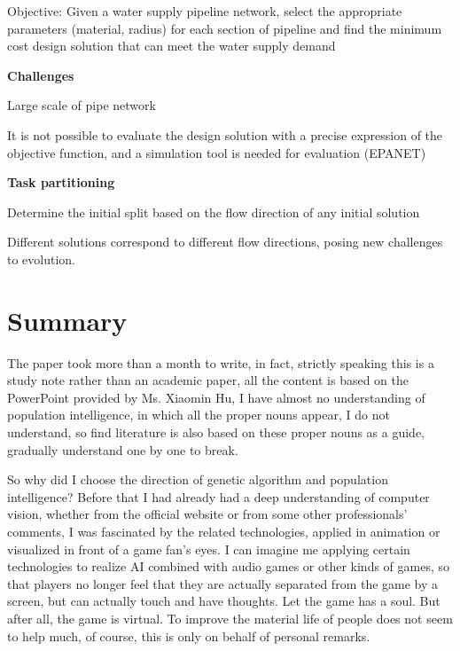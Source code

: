 \documentclass[twocolumn]{article}
\begin{document}
Objective: Given a water supply pipeline network, select the appropriate
parameters (material, radius) for each section of pipeline and find the
minimum cost design solution that can meet the water supply demand

\textbf{Challenges}

Large scale of pipe network

It is not possible to evaluate the design solution with a precise
expression of the objective function, and a simulation tool is needed
for evaluation (EPANET)

\textbf{Task partitioning}

Determine the initial split based on the flow direction of any initial
solution

Different solutions correspond to different flow directions, posing new
challenges to evolution.

\section{Summary}

The paper took more than a month to write, in fact, strictly speaking
this is a study note rather than an academic paper, all the content is
based on the PowerPoint provided by Ms. Xiaomin Hu, I have almost no
understanding of population intelligence, in which all the proper nouns
appear, I do not understand, so find literature is also based on these
proper nouns as a guide, gradually understand one by one to break.

So why did I choose the direction of genetic algorithm and population
intelligence? Before that I had already had a deep understanding of
computer vision, whether from the official website or from some other
professionals' comments, I was fascinated by the related technologies,
applied in animation or visualized in front of a game fan's eyes. I can
imagine me applying certain technologies to realize AI combined with
audio games or other kinds of games, so that players no longer feel that
they are actually separated from the game by a screen, but can actually
touch and have thoughts. Let the game has a soul. But after all, the
game is virtual. To improve the material life of people does not seem to
help much, of course, this is only on behalf of personal remarks.
\end{document}
